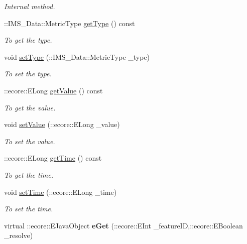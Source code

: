 \begin{DoxyCompactItemize}
\begin{DoxyCompactList}\small\item\em Internal method. \item\end{DoxyCompactList}\item 
::IMS\_\-Data::MetricType \hyperlink{classIMS__Data_1_1Metric_ae4d552a9540df4232be39debc452a585}{getType} () const 
\begin{DoxyCompactList}\small\item\em To get the type. \item\end{DoxyCompactList}\item 
void \hyperlink{classIMS__Data_1_1Metric_a6858553837be2c8cd3b21d7039cbf1fd}{setType} (::IMS\_\-Data::MetricType \_\-type)
\begin{DoxyCompactList}\small\item\em To set the type. \item\end{DoxyCompactList}\item 
::ecore::ELong \hyperlink{classIMS__Data_1_1Metric_a732ecfcd3340cee108861f701c56a908}{getValue} () const 
\begin{DoxyCompactList}\small\item\em To get the value. \item\end{DoxyCompactList}\item 
void \hyperlink{classIMS__Data_1_1Metric_af6529e692399919e6b5e9c17dd6d9cbb}{setValue} (::ecore::ELong \_\-value)
\begin{DoxyCompactList}\small\item\em To set the value. \item\end{DoxyCompactList}\item 
::ecore::ELong \hyperlink{classIMS__Data_1_1Metric_a571fccac904a3b1286ed5579f444d7a9}{getTime} () const 
\begin{DoxyCompactList}\small\item\em To get the time. \item\end{DoxyCompactList}\item 
void \hyperlink{classIMS__Data_1_1Metric_ac76e0ff373587a86a44d2eb82980cc2a}{setTime} (::ecore::ELong \_\-time)
\begin{DoxyCompactList}\small\item\em To set the time. \item\end{DoxyCompactList}\item 
\hypertarget{classIMS__Data_1_1Metric_a0ec95c401607af629e701369b0309643}{
virtual ::ecore::EJavaObject {\bfseries eGet} (::ecore::EInt \_\-featureID,::ecore::EBoolean \_\-resolve)}
\label{classIMS__Data_1_1Metric_a0ec95c401607af629e701369b0309643}


\end{DoxyCompactItemize}
